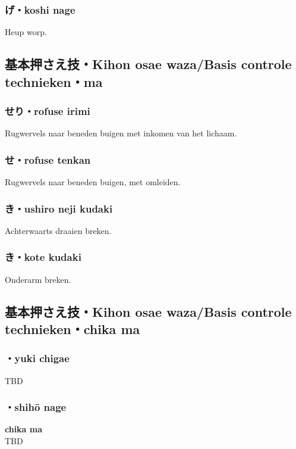 \subsubsection{げ・koshi nage}
Heup worp.

\subsection{基本押さえ技・Kihon osae waza/Basis controle technieken・\textbf{ma}}
\subsubsection{せり・rofuse irimi}
Rugwervels naar beneden buigen met inkomen van het lichaam.

\subsubsection{せ・rofuse tenkan}
Rugwervels naar beneden buigen, met omleiden.

\subsubsection{き・ushiro neji kudaki}
Achterwaarts draaien breken.

\subsubsection{き・kote kudaki}
Onderarm breken.

\subsection{基本押さえ技・Kihon osae waza/Basis controle technieken・\textbf{chika ma}}
\subsubsection{\ruby{}{}\ruby{}{}・yuki chigae}
TBD

\subsubsection{\ruby{}{}\ruby{}{}・shih\={o} nage}
\textbf{chika ma}\\
TBD

